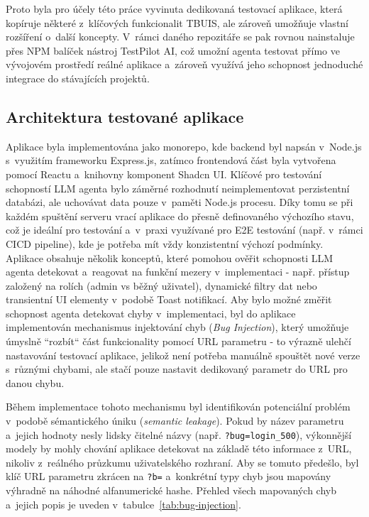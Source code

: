 \documentclass[czech, ing, kiv, he, iso690numb, viewonly]{fasthesis}
\begin{document}
Proto byla pro účely této práce vyvinuta dedikovaná testovací aplikace, která kopíruje některé
z~klíčových funkcionalit TBUIS, ale zároveň umožňuje vlastní rozšíření o~další koncepty.
V~rámci daného repozitáře se pak rovnou nainstaluje přes NPM balíček nástroj TestPilot AI,
což umožní agenta testovat přímo ve vývojovém prostředí reálné aplikace a~zároveň využívá 
jeho schopnost jednoduché integrace do stávajících projektů.



\subsection{Architektura testované aplikace}
Aplikace byla implementována jako monorepo, kde backend byl napsán v~Node.js s~využitím frameworku Express.js, 
zatímco frontendová část byla vytvořena pomocí Reactu a~knihovny komponent Shadcn UI.
Klíčové pro testování schopností LLM agenta bylo záměrné rozhodnutí neimplementovat perzistentní databázi,
ale uchovávat data pouze v~paměti Node.js procesu. Díky tomu se při každém spuštění serveru vrací aplikace do přesně definovaného výchozího stavu, 
což je ideální pro testování a~v~praxi využívané pro E2E testování (např. v~rámci CICD pipeline), kde je potřeba mít vždy konzistentní výchozí podmínky.
Aplikace obsahuje několik konceptů, které pomohou ověřit schopnosti LLM agenta detekovat a~reagovat na funkční mezery v~implementaci - 
např. přístup založený na rolích (admin vs běžný uživatel), dynamické filtry dat nebo transientní UI elementy v~podobě Toast notifikací.
Aby bylo možné změřit schopnost agenta detekovat chyby v~implementaci, byl do aplikace implementován mechanismus injektování chyb
(\textit{Bug Injection}), který umožňuje úmyslně ``rozbít`` část funkcionality pomocí URL parametru - 
to výrazně ulehčí nastavování testovací aplikace, jelikož není potřeba manuálně spouštět nové verze s~různými chybami, 
ale stačí pouze nastavit dedikovaný parametr do URL pro danou chybu.

Během implementace tohoto mechanismu byl identifikován potenciální problém v~podobě sémantického úniku (\textit{semantic leakage}). 
Pokud by název parametru a~jejich hodnoty nesly lidsky čitelné názvy (např. \texttt{?bug=login\_500}), 
výkonnější modely by mohly chování aplikace detekovat na základě této informace z~URL, nikoliv z~reálného průzkumu uživatelského rozhraní. Aby se tomuto předešlo, byl klíč URL parametru zkrácen na \texttt{?b=} 
a~konkrétní typy chyb jsou mapovány výhradně na náhodné alfanumerické hashe. Přehled všech 
mapovaných chyb a~jejich popis je uveden v~tabulce~\ref{tab:bug-injection}.
\end{document}
